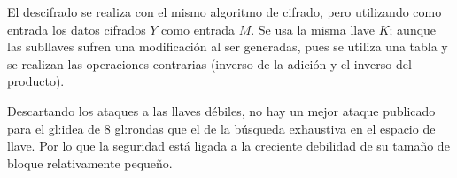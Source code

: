 El descifrado se realiza con el mismo algoritmo de cifrado, pero
utilizando como entrada los datos cifrados $Y$ como entrada $M$. Se usa la
misma llave $K$; aunque las subllaves sufren una modificación al ser
generadas, pues se utiliza una tabla y se realizan las operaciones
contrarias (inverso de la adición y el inverso del producto).

Descartando los ataques a las llaves débiles, no hay un mejor ataque
publicado para el \acrshort{gl:idea} de 8 \glspl{gl:ronda} que el de la búsqueda
exhaustiva en el espacio de llave. Por lo que la seguridad está ligada a la
creciente debilidad de su tamaño de bloque relativamente pequeño.
